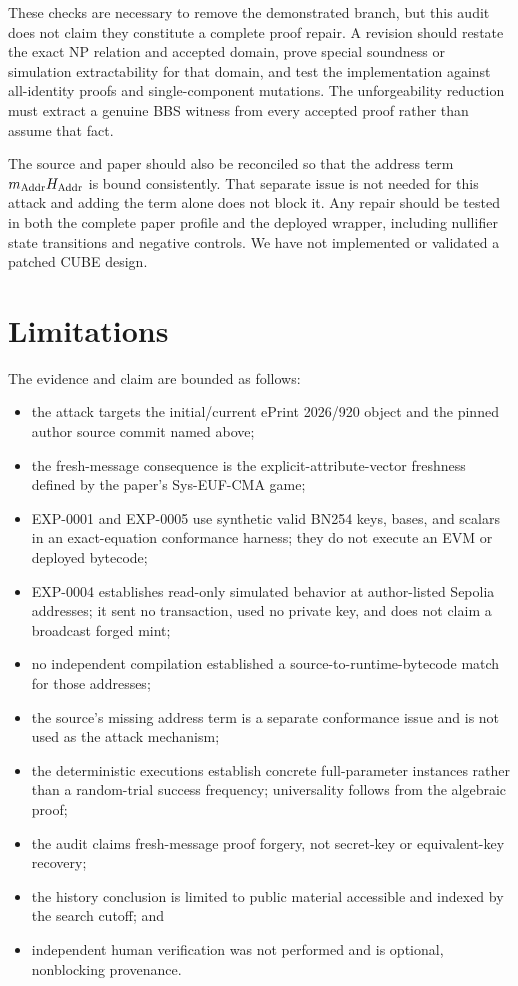 \documentclass[10pt,a4paper]{article}
\begin{document}
These checks are necessary to remove the demonstrated branch, but this audit
does not claim they constitute a complete proof repair. A revision should
restate the exact NP relation and accepted domain, prove special soundness or
simulation extractability for that domain, and test the implementation against
all-identity proofs and single-component mutations. The unforgeability
reduction must extract a genuine BBS witness from every accepted proof rather
than assume that fact.

The source and paper should also be reconciled so that the address term
$m_{\rm Addr}H_{\rm Addr}$ is bound consistently. That separate issue is not
needed for this attack and adding the term alone does not block it. Any repair
should be tested in both the complete paper profile and the deployed wrapper,
including nullifier state transitions and negative controls. We have not
implemented or validated a patched CUBE design.

\section{Limitations}

The evidence and claim are bounded as follows:
\begin{itemize}
  \item the attack targets the initial/current ePrint 2026/920 object and the
        pinned author source commit named above;
  \item the fresh-message consequence is the explicit-attribute-vector
        freshness defined by the paper's Sys-EUF-CMA game;
  \item EXP-0001 and EXP-0005 use synthetic valid BN254 keys, bases, and
        scalars in an exact-equation conformance harness; they do not execute
        an EVM or deployed bytecode;
  \item EXP-0004 establishes read-only simulated behavior at author-listed
        Sepolia addresses; it sent no transaction, used no private key, and
        does not claim a broadcast forged mint;
  \item no independent compilation established a source-to-runtime-bytecode
        match for those addresses;
  \item the source's missing address term is a separate conformance issue and
        is not used as the attack mechanism;
  \item the deterministic executions establish concrete full-parameter
        instances rather than a random-trial success frequency; universality
        follows from the algebraic proof;
  \item the audit claims fresh-message proof forgery, not secret-key or
        equivalent-key recovery;
  \item the history conclusion is limited to public material accessible and
        indexed by the search cutoff; and
  \item independent human verification was not performed and is optional,
        nonblocking provenance.
\end{itemize}
\end{document}
